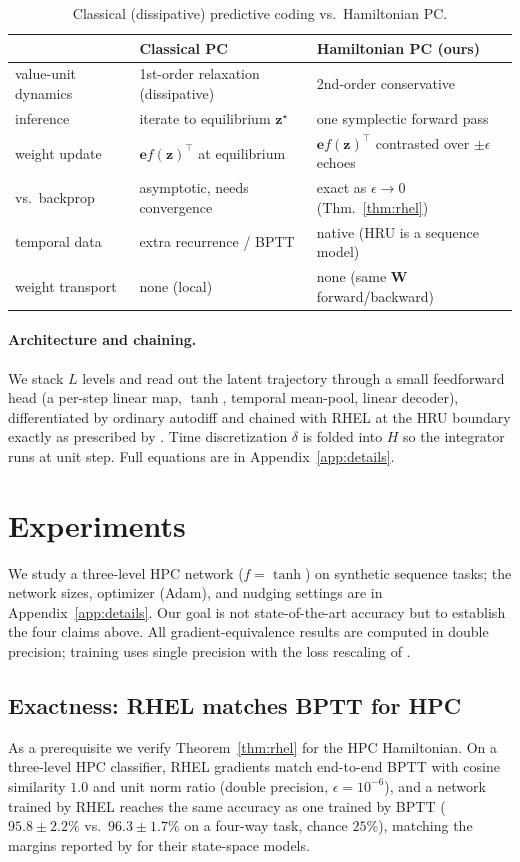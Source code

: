 \documentclass[10pt]{article}
\theoremstyle{remark}
\newcommand{\bz}{\mathbf{z}}
\newcommand{\bW}{\mathbf{W}}
\newcommand{\eps}{\epsilon}
\begin{document}
\begin{table}[t]
\centering
\caption{Classical (dissipative) predictive coding vs.\ Hamiltonian PC.}
\label{tab:compare}
\small
\begin{tabular}{lll}
\toprule
 & Classical PC & Hamiltonian PC (ours) \\
\midrule
value-unit dynamics & 1st-order relaxation (dissipative) & 2nd-order conservative \\
inference & iterate to equilibrium $\bz^\star$ & one symplectic forward pass \\
weight update & $\mathbf{e}f(\bz)^{\!\top}$ at equilibrium & $\mathbf{e}f(\bz)^{\!\top}$ contrasted over $\pm\eps$ echoes \\
vs.\ backprop & asymptotic, needs convergence & exact as $\eps\!\to\!0$ (Thm.~\ref{thm:rhel}) \\
temporal data & extra recurrence / BPTT & native (HRU is a sequence model) \\
weight transport & none (local) & none (same $\bW$ forward/backward) \\
\bottomrule
\end{tabular}
\end{table}

\paragraph{Architecture and chaining.} We stack $L$ levels and read out the
latent trajectory through a small feedforward head (a per-step linear map,
$\tanh$, temporal mean-pool, linear decoder), differentiated by ordinary
autodiff and chained with RHEL at the HRU boundary exactly as prescribed by
\citet{rhel}. Time discretization $\delta$ is folded into $H$ so the
integrator runs at unit step. Full equations are in
Appendix~\ref{app:details}.

\section{Experiments}
\label{sec:experiments}

We study a three-level HPC network ($f=\tanh$) on synthetic sequence tasks;
the network sizes, optimizer (Adam), and nudging settings are in
Appendix~\ref{app:details}. Our goal is not state-of-the-art accuracy but to
establish the four claims above. All gradient-equivalence results are
computed in double precision; training uses single precision with the loss
rescaling of \citet{rhel}.

\subsection{Exactness: RHEL matches BPTT for HPC}
\label{sec:exact}
As a prerequisite we verify Theorem~\ref{thm:rhel} for the HPC Hamiltonian.
On a three-level HPC classifier, RHEL gradients match end-to-end BPTT with
cosine similarity $1.0$ and unit norm ratio (double precision, $\eps=10^{-6}$),
and a network trained by RHEL reaches the same accuracy as one trained by
BPTT ($95.8\pm2.2\%$ vs.\ $96.3\pm1.7\%$ on a four-way task, chance $25\%$),
matching the margins reported by \citet{rhel} for their state-space models.
\end{document}

